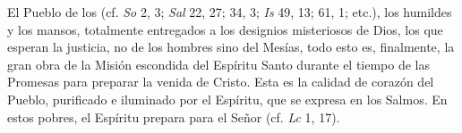 	 El Pueblo de los  (cf. \emph{So} 2, 3; \emph{Sal} 22, 27; 34, 3; \emph{Is} 49, 13; 61, 1; etc.), los humildes y los mansos, totalmente entregados a los designios misteriosos de Dios, los que esperan la justicia, no de los hombres sino del Mesías, todo esto es, finalmente, la gran obra de la Misión escondida del Espíritu Santo durante el tiempo de las Promesas para preparar la venida de Cristo. Esta es la calidad de corazón del Pueblo, purificado e iluminado por el Espíritu, que se expresa en los Salmos. En estos pobres, el Espíritu prepara para el Señor  (cf. \emph{Lc} 1, 17).
